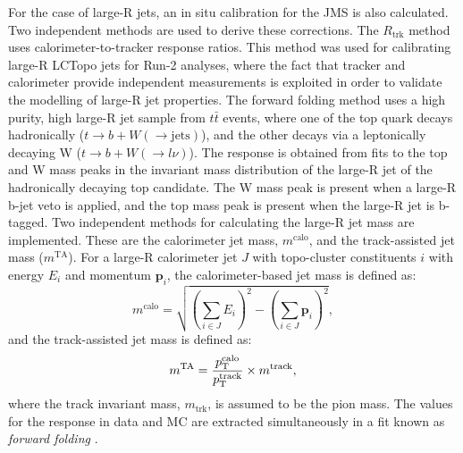 For the case of large-R jets, an in situ calibration for the JMS is also calculated. Two independent methods are used to derive these corrections. The $R_{\text{trk}}$ method uses calorimeter-to-tracker response ratios. This method was used for calibrating large-R LCTopo jets for Run-2 analyses, where the fact that tracker and calorimeter provide independent measurements is exploited in order to validate the modelling of large-R jet properties. The forward folding method uses a high purity, high \pt large-R jet sample from $t\bar{t}$ events, where one of the top quark decays hadronically ($t\rightarrow b+W(\rightarrow\text{jets})$), and the other decays via a leptonically decaying W ($t\rightarrow b+W(\rightarrow l\nu)$). The response is obtained from fits to the top and W mass peaks in the invariant mass distribution of the large-R jet of the hadronically decaying top candidate. The W mass peak is present when a large-R b-jet veto is applied, and the top mass peak is present when the large-R jet is b-tagged. Two independent methods for calculating the large-R jet mass are implemented. These are the calorimeter jet mass, $m^{\text{calo}}$, and the track-assisted jet mass ($m^{\text{TA}}$). For a large-R calorimeter jet $J$ with topo-cluster constituents $i$ with energy $E_i$ and momentum $\mathbf{p}_i$, the calorimeter-based jet mass is defined as:
\begin{equation}
    m^{\text{calo}}=\sqrt{(\sum_{i\in J}E_i)^2-(\sum_{i\in J}\mathbf{p}_i)^2},
\end{equation}
and the track-assisted jet mass is defined as:
\begin{equation}
    m^{\text{TA}}=\frac{p_{\text{T}}^\text{calo}}{p_{\text{T}}^\text{track}}\times m^{\text{track}},
\end{equation}
where the track invariant mass, $m_{\text{trk}}$, is assumed to be the pion mass. The values for the response in data and MC are extracted simultaneously in a fit known as \textit{forward folding} \cite{Atlas:largercali}.

